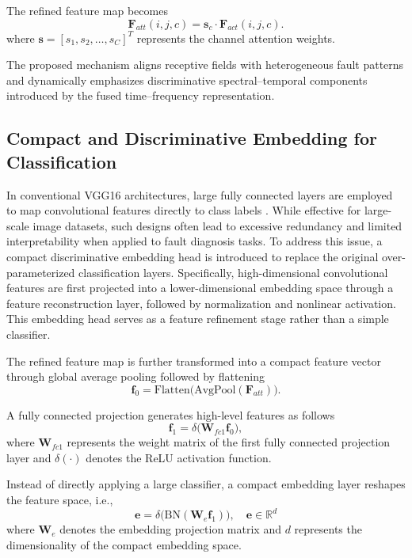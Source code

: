 \documentclass[anonymous]{iopjournal}
\begin{document}
The refined feature map becomes
\begin{equation}
	\boldsymbol{F}_{att}(i,j,c) = \boldsymbol{s}_c \cdot \boldsymbol{F}_{act}(i,j,c).
	\label{eq:attention_feature}
\end{equation}
where $\boldsymbol{s} = [s_1, s_2, \dots, s_C]^T$ represents the
channel attention weights.

The proposed mechanism aligns receptive fields with heterogeneous fault patterns and dynamically emphasizes discriminative spectral–temporal components introduced by the fused time–frequency representation.

\subsection{Compact and Discriminative Embedding for Classification}
In conventional VGG16 architectures, large fully connected layers are employed to map convolutional features directly to class labels \cite{9770845}. While effective for large-scale image datasets, such designs often lead to excessive redundancy and limited interpretability when applied to fault diagnosis tasks. To address this issue, a compact discriminative embedding head is introduced to replace the original over-parameterized classification layers. Specifically, high-dimensional convolutional features are first projected into a lower-dimensional embedding space through a feature reconstruction layer, followed by normalization and nonlinear activation. This embedding head serves as a feature refinement stage rather than a simple classifier.

The refined feature map is further transformed into a compact feature vector through global average pooling followed by flattening
\begin{equation}
	\boldsymbol{f}_0 = \text{Flatten}\big(\text{AvgPool}(\boldsymbol{F}_{att})\big).
	\label{eq:flatten_feature}
\end{equation}

A fully connected projection generates high-level features as follows
\begin{equation}
	\boldsymbol{f}_1 = \delta\big(\boldsymbol{W}_{fc1} \boldsymbol{f}_0\big),
	\label{eq:fc1_feature}
\end{equation}
where $\boldsymbol{W}_{fc1}$ represents the weight matrix of the first fully
connected projection layer and $\delta(\cdot)$ denotes the ReLU
activation function.

Instead of directly applying a large classifier, a compact embedding layer reshapes the feature space, i.e.,
\begin{equation}
	\boldsymbol{e} = \delta\big(\text{BN}(\boldsymbol{W}_e \boldsymbol{f}_1)\big), \quad \boldsymbol{e} \in \mathbb{R}^d
	\label{eq:embedding}
\end{equation}
where $\boldsymbol{W}_e$ denotes the embedding projection matrix and
$d$ represents the dimensionality of the compact embedding space.
\end{document}
